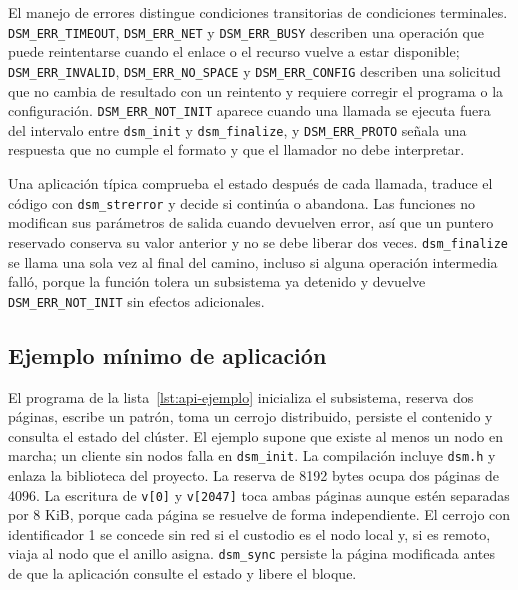 El manejo de errores distingue condiciones transitorias de condiciones terminales. \texttt{DSM\_ERR\_TIMEOUT}, \texttt{DSM\_ERR\_NET} y \texttt{DSM\_ERR\_BUSY} describen una operación que puede reintentarse cuando el enlace o el recurso vuelve a estar disponible; \texttt{DSM\_ERR\_INVALID}, \texttt{DSM\_ERR\_NO\_SPACE} y \texttt{DSM\_ERR\_CONFIG} describen una solicitud que no cambia de resultado con un reintento y requiere corregir el programa o la configuración. \texttt{DSM\_ERR\_NOT\_INIT} aparece cuando una llamada se ejecuta fuera del intervalo entre \texttt{dsm\_init} y \texttt{dsm\_finalize}, y \texttt{DSM\_ERR\_PROTO} señala una respuesta que no cumple el formato y que el llamador no debe interpretar.

Una aplicación típica comprueba el estado después de cada llamada, traduce el código con \texttt{dsm\_strerror} y decide si continúa o abandona. Las funciones no modifican sus parámetros de salida cuando devuelven error, así que un puntero reservado conserva su valor anterior y no se debe liberar dos veces. \texttt{dsm\_finalize} se llama una sola vez al final del camino, incluso si alguna operación intermedia falló, porque la función tolera un subsistema ya detenido y devuelve \texttt{DSM\_ERR\_NOT\_INIT} sin efectos adicionales.

\subsection{Ejemplo mínimo de aplicación}

El programa de la lista~\ref{lst:api-ejemplo} inicializa el subsistema, reserva dos páginas, escribe un patrón, toma un cerrojo distribuido, persiste el contenido y consulta el estado del clúster. El ejemplo supone que existe al menos un nodo en marcha; un cliente sin nodos falla en \texttt{dsm\_init}. La compilación incluye \texttt{dsm.h} y enlaza la biblioteca del proyecto. La reserva de 8192 bytes ocupa dos páginas de 4096. La escritura de \texttt{v[0]} y \texttt{v[2047]} toca ambas páginas aunque estén separadas por 8 KiB, porque cada página se resuelve de forma independiente. El cerrojo con identificador 1 se concede sin red si el custodio es el nodo local y, si es remoto, viaja al nodo que el anillo asigna. \texttt{dsm\_sync} persiste la página modificada antes de que la aplicación consulte el estado y libere el bloque.

